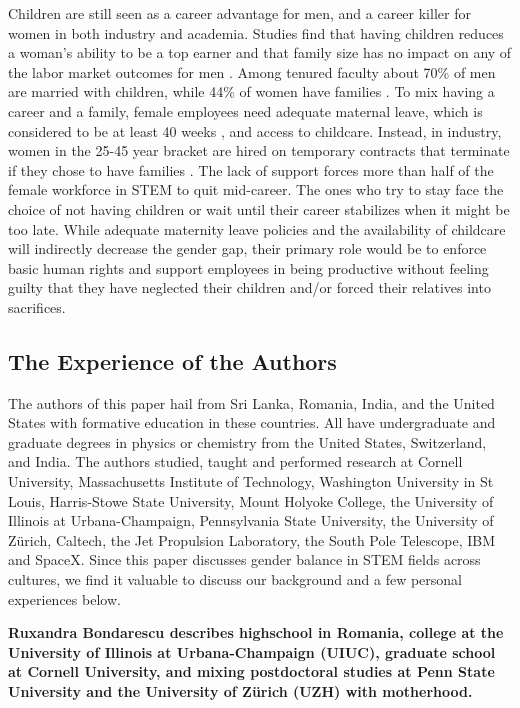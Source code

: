 \documentclass[utf8]{frontiersSCNS} %
\begin{document}
Children are still seen as a career advantage for men, and a career killer for women in both industry and academia. Studies find that having children reduces a woman's ability to be a top earner and that family size has no impact on any of the labor market outcomes for men \citep{Cools2017}. Among tenured faculty about 70\% of men are married with children, while 44\% of women have families \citep{mason2004marriage}. To mix having a career and a family, female employees need adequate maternal leave, which is considered to be at least 40 weeks \citep{ruhm2000parental}, and access to childcare. Instead, in industry, women in the 25-45 year bracket are hired on temporary contracts that terminate if they chose to have families \citep{Cools2017}.   The lack of support forces more than half of the female workforce in STEM to quit mid-career. The ones who try to stay face the choice of not having children or wait until their career stabilizes when it might be too late.  While adequate maternity leave policies and the availability of childcare will indirectly decrease the gender gap, their primary role would be to enforce basic human rights and support  employees in being productive without feeling guilty that they have neglected their children and/or forced their relatives into sacrifices. 
 
 \subsection{The Experience of the Authors}
 \label{Sec10}
 The authors of this paper hail from Sri Lanka, Romania, India, and the United States with formative education in these countries.  All have undergraduate and graduate degrees in physics or chemistry from the United States, Switzerland, and India.   The authors studied, taught and performed research at Cornell University, Massachusetts Institute of Technology, Washington University in St Louis, Harris-Stowe State University, Mount Holyoke College, the University of Illinois at Urbana-Champaign, Pennsylvania State University, the University of Z\"{u}rich, Caltech, the Jet Propulsion Laboratory, the South Pole Telescope, IBM and SpaceX. Since this paper discusses gender balance in STEM fields across cultures, we find it valuable to discuss our background and a few personal experiences below.

{\bf Ruxandra Bondarescu describes highschool in Romania, college at the University of Illinois at Urbana-Champaign (UIUC), graduate school at Cornell University, and mixing postdoctoral studies at Penn State University and the University of Z\"{u}rich (UZH) with motherhood.}
\end{document}
